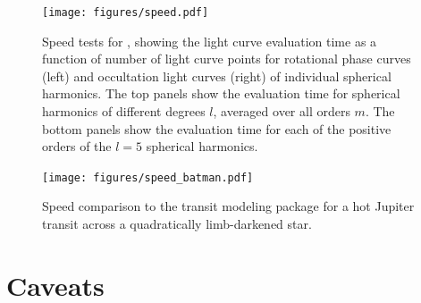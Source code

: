\documentclass[modern]{aastex61}
\begin{document}
\begin{figure}[p!]
    \begin{centering}
    \texttt{[image: figures/speed.pdf]}
    \caption{\label{fig:speed}
             Speed tests for \starry, showing the light curve evaluation time
             as a function of number of light curve points for rotational
             phase curves (left) and occultation light curves (right) of individual
             spherical harmonics. The top
             panels show the evaluation time for spherical harmonics of different
             degrees $l$, averaged over all orders $m$. The bottom panels
             show the evaluation time for each of the positive orders
             of the $l = 5$ spherical harmonics.
             }
    \end{centering}
\end{figure}

\begin{figure}[p!]
    \begin{centering}
    \texttt{[image: figures/speed\_batman.pdf]}
    \caption{\label{fig:speed_batman}
             Speed comparison to the \batman transit modeling package
             \citep{Kreidberg2015} for a hot Jupiter transit across a
             quadratically limb-darkened star.
             }
    \end{centering}
\end{figure}

\section{Caveats}
\label{sec:caveats}
\end{document}
